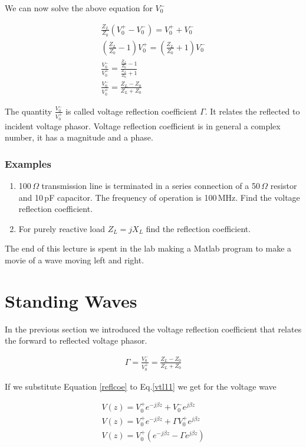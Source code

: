 \documentclass{ximera}
\begin{document}
We can now solve the above equation for $V_0^-$

\begin{eqnarray}
\frac{Z_L}{Z_0} (V_0^+ - V_0^-) = V_0^+ + V_0^- \nonumber \\
(\frac{Z_L}{Z_0}-1)V_0^+ =(\frac{Z_L}{Z_0}+1) V_0^- \nonumber \\
\frac{V_0^-}{V_0^+} = \frac{\frac{Z_L}{Z_0}-1  }{ \frac{Z_L}{Z_0}+1 }
\nonumber \\
\frac{V_0^-}{V_0^+} = \frac{Z_L -Z_0}{Z_L +Z_0}
\end{eqnarray}

The quantity $\frac{V_0^-}{V_0^+}$ is called voltage reflection
coefficient $\Gamma$. It relates the reflected to incident voltage
phasor. Voltage reflection coefficient is in general a complex number,
it has a magnitude and a phase.



\subsubsection{Examples}


 \begin{enumerate}
\item 100\,$\Omega$ transmission line is terminated in a series
connection of a 50\,$\Omega$ resistor and 10\,pF capacitor. The frequency
of operation is 100\,MHz. Find the voltage reflection coefficient.
\item For purely reactive load $Z_L=j X_L$ find the reflection
coefficient.
\end{enumerate}

The end of this lecture is spent in the lab making a Matlab program to
make a movie of a wave moving left and right.


\section{Standing Waves}


In the previous section we introduced the voltage reflection
coefficient that relates the forward to reflected voltage phasor.


\begin{eqnarray}
\Gamma = \frac{V_0^-}{V_0^+} = \frac{Z_L -Z_0}{Z_L +Z_0} \label{reflcoe}
\end{eqnarray}


If we substitute Equation \ref{reflcoe} to Eq.\ref{vtl11} we get for the voltage wave


\begin{eqnarray}
V(z) = V_0^+ e^{-j \beta z} +V_0^- e^{j \beta z} \label{vtl11}\\
V(z) = V_0^+ e^{-j \beta z} + \Gamma  V_0^+ e^{j \beta z} \nonumber
\\
V(z)= V_0^+ (e^{-j \beta z} - \Gamma  e^{j \beta z}  ) \label{vtl01}
\end{eqnarray}
\end{document}
